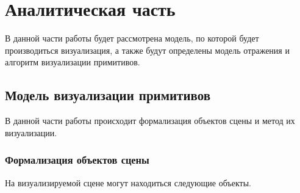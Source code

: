 
\chapter{Аналитическая часть}
В данной части работы будет рассмотрена модель, по которой будет производиться
визуализация, а также будут определены модель отражения и алгоритм визуализации примитивов.
\section{Модель визуализации примитивов}
В данной части работы происходит формализация объектов сцены и метод их визуализации.

\subsection{Формализация объектов сцены}
\label{sec:obj_formalasation}
На визуализируемой сцене могут находиться следующие объекты.
